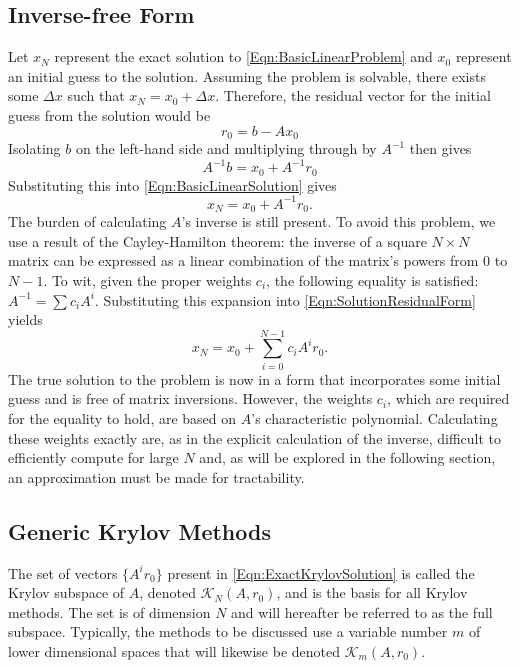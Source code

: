 \documentclass[Prelim,12pt]{WisconsinThesis}
\newcommand{\by}    {\!\times\!}
\begin{document}
\subsection{Inverse-free Form}
Let $x_N$ represent the exact solution to \cref{Eqn:BasicLinearProblem} and $x_0$ represent an initial guess to the solution.
Assuming the problem is solvable, there exists some $\Delta{x}$ such that $x_N = x_0 + \Delta{x}$.
Therefore, the residual vector for the initial guess from the solution would be
\begin{equation}
    r_0 = b - A x_0
    \label{Eqn:InitialResidual}
\end{equation}
Isolating $b$ on the left-hand side and multiplying through by $A^{-1}$ then gives
\begin{equation}
    A^{-1} b = x_0 + A^{-1} r_0
\end{equation}
Substituting this into \cref{Eqn:BasicLinearSolution} gives
\begin{equation}
    x_N = x_0 + A^{-1} r_0.
    \label{Eqn:SolutionResidualForm}
\end{equation}
The burden of calculating $A$'s inverse is still present.
To avoid this problem, we use a result of the Cayley-Hamilton theorem: the inverse of a square $N \by N$ matrix can be expressed as a linear combination of the matrix's powers from $0$ to $N-1$.
To wit, given the proper weights $c_i$, the following equality is satisfied: $A^{-1} = \sum c_i A^i$.
Substituting this expansion into \cref{Eqn:SolutionResidualForm} yields
\begin{equation}
    x_N = x_0 + \sum_{i = 0}^{N-1} c_i A^i r_0.
    \label{Eqn:ExactKrylovSolution}
\end{equation}
The true solution to the problem is now in a form that incorporates some initial guess and is free of matrix inversions.
However, the weights $c_i$, which are required for the equality to hold, are based on $A$'s characteristic polynomial.
Calculating these weights exactly are, as in the explicit calculation of the inverse, difficult to efficiently compute for large $N$ and, as will be explored in the following section, an approximation must be made for tractability.


\subsection{Generic Krylov Methods}

The set of vectors $\{A^i r_0\}$ present in \cref{Eqn:ExactKrylovSolution} is called the Krylov subspace of $A$, denoted $\mathcal{K}_N(A,r_0)$, and is the basis for all Krylov methods.
The set is of dimension $N$ and will hereafter be referred to as the full subspace.
Typically, the methods to be discussed use a variable number $m$ of lower dimensional spaces that will likewise be denoted $\mathcal{K}_m(A,r_0)$.
\end{document}
